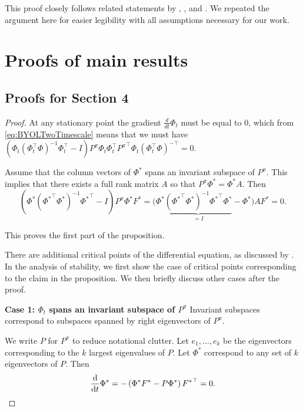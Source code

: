 This proof closely follows related statements by \cite{ghosh2020representations}, \cite{tang2022understanding}, and \cite{lelan2022generalization}. We repeated the argument here for easier legibility with all assumptions necessary for our work.

\section{Proofs of main results}
\label{app:proofs}

\subsection*{Proofs for Section 4}

\BYOLGradientFlow*
\begin{proof}
    At any stationary point the gradient $\frac{d}{dt}\Phi_t$ must be equal to $0$, which from \cref{eq:BYOLTwoTimescale} means that we must have $\left(\Phi_t\left(\Phi^\top_t \Phi\right)^{-1}\Phi_t^\top - I\right)P^\pi\Phi_t \Phi_t^\top {P^\pi}^\top \Phi_t\left(\Phi^\top_t \Phi\right)^{-\top}=0$.

    Assume that the column vectors of $\Phi^*$ spans an invariant subspace of $P^\pi$. This implies that there exists a full rank matrix $A$ so that $P^\pi \Phi^* = \Phi^*A$.
    Then 
    $$\left(\Phi^*\left({\Phi^*}^\top \Phi^*\right)^{-1}{\Phi^*}^\top - I\right)P^\pi\Phi^* F^*=\Big(\Phi^*\underbrace{\left({\Phi^*}^\top \Phi^*\right)^{-1}{\Phi^*}^\top\Phi^*}_{=I} - \Phi^*\Big)A F^*=0.$$

This proves the first part of the proposition.

There are additional critical points of the differential equation, as discussed by \cite{tang2022understanding}.
In the analysis of stability, we first show the case of critical points corresponding to the claim in the proposition.
We then briefly discuss other cases after the proof.

\textbf{Case 1: $\Phi_t$ spans an invariant subspace of $P^\pi$}
Invariant subspaces correspond to subspaces spanned by right eigenvectors of $P^\pi$.

We write $P$ for $P^\pi$ to reduce notational clutter.
Let $e_1,\dots,e_k$ be the eigenvectors corresponding to the $k$ largest eigenvalues of $P$.
Let $\Phi^*$ correspond to any set of $k$ eigenvectors of $P$. Then
\begin{align*}
    \frac{\mathrm{d}}{\mathrm{d} t}\Phi^* = -\left(\Phi^* F^* - P \Phi^*\right) {F^*}^\top = 0.
\end{align*}


\end{proof}
